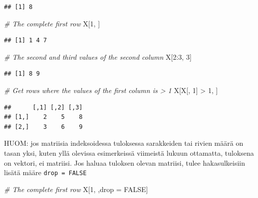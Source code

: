 \documentclass[
]{book}
\newenvironment{Shaded}{\begin{snugshade}}{\end{snugshade}}
\newcommand{\CommentTok}[1]{\textcolor[rgb]{0.56,0.35,0.01}{\textit{#1}}}
\newcommand{\ConstantTok}[1]{\textcolor[rgb]{0.00,0.00,0.00}{#1}}
\newcommand{\DecValTok}[1]{\textcolor[rgb]{0.00,0.00,0.81}{#1}}
\newcommand{\NormalTok}[1]{#1}
\newcommand{\OtherTok}[1]{\textcolor[rgb]{0.56,0.35,0.01}{#1}}
\newcommand{\SpecialCharTok}[1]{\textcolor[rgb]{0.00,0.00,0.00}{#1}}
\begin{document}
\begin{verbatim}
## [1] 8
\end{verbatim}

\begin{Shaded}
\begin{Highlighting}[]
\CommentTok{\# The complete first row}
\NormalTok{X[}\DecValTok{1}\NormalTok{, ]}
\end{Highlighting}
\end{Shaded}

\begin{verbatim}
## [1] 1 4 7
\end{verbatim}

\begin{Shaded}
\begin{Highlighting}[]
\CommentTok{\# The second and third values of the second column}
\NormalTok{X[}\DecValTok{2}\SpecialCharTok{:}\DecValTok{3}\NormalTok{, }\DecValTok{3}\NormalTok{]}
\end{Highlighting}
\end{Shaded}

\begin{verbatim}
## [1] 8 9
\end{verbatim}

\begin{Shaded}
\begin{Highlighting}[]
\CommentTok{\# Get rows where the values of the first column is \textgreater{} 1}
\NormalTok{X[X[, }\DecValTok{1}\NormalTok{] }\SpecialCharTok{\textgreater{}} \DecValTok{1}\NormalTok{, ]}
\end{Highlighting}
\end{Shaded}

\begin{verbatim}
##      [,1] [,2] [,3]
## [1,]    2    5    8
## [2,]    3    6    9
\end{verbatim}

HUOM: jos matriisia indeksoidessa tuloksessa sarakkeiden tai rivien määrä on tasan yksi, kuten yllä olevissa esimerkeissä viimeistä lukuun ottamatta, tuloksena on vektori, ei matriisi. Jos haluaa tuloksen olevan matriisi, tulee hakasulkeisiin lisätä määre \texttt{drop\ =\ FALSE}

\begin{Shaded}
\begin{Highlighting}[]
\CommentTok{\# The complete first row}
\NormalTok{X[}\DecValTok{1}\NormalTok{, ,drop }\OtherTok{=} \ConstantTok{FALSE}\NormalTok{]}
\end{Highlighting}
\end{Shaded}
\end{document}
